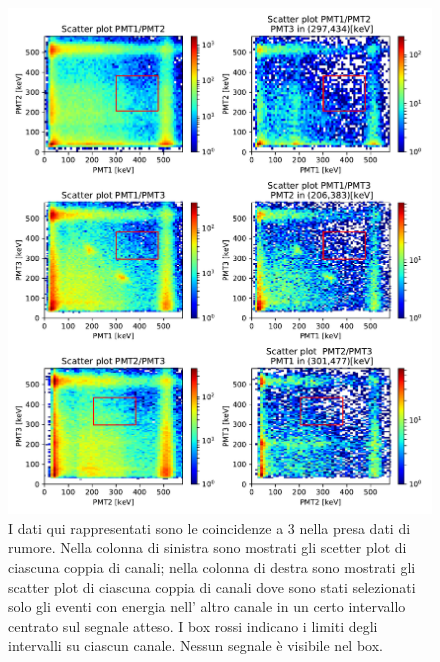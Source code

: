  \begin{figure}[h]
	\hspace{-4em}
	\includegraphics[width=44em]{immagini/3gamma_noise}
	\caption{\label{fig:3gamma_noise} I dati qui rappresentati sono le coincidenze a 3 nella presa dati di rumore. Nella colonna di sinistra sono mostrati gli scetter plot di ciascuna coppia di canali; nella colonna di destra sono mostrati gli scatter plot di ciascuna coppia di canali dove sono stati selezionati solo gli eventi con energia nell' altro canale in un certo intervallo centrato sul segnale atteso. I box rossi indicano i limiti degli intervalli su ciascun canale. Nessun segnale è visibile nel box.}
\end{figure}

	



